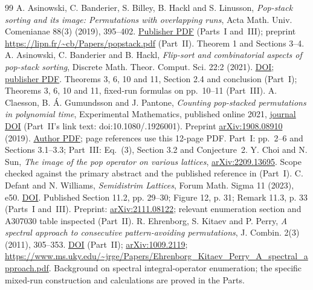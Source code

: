 \documentclass[11pt,letterpaper]{article}
\numberwithin{equation}{section}
\theoremstyle{remark}\newtheorem{remark}[theorem]{Remark}
\begin{document}
\begin{thebibliography}{99}
A. Asinowski, C. Banderier, S. Billey, B. Hackl and S. Linusson,
\emph{Pop-stack sorting and its image: Permutations with overlapping runs},
Acta Math. Univ. Comenianae 88(3) (2019), 395--402.
\href{https://www.iam.fmph.uniba.sk/amuc/ojs/index.php/amuc/article/download/1307/672/}{Publisher PDF} (Parts~I and~III);
preprint \url{https://lipn.fr/~cb/Papers/popstack.pdf} (Part~II).
Theorem 1 and Sections 3--4.
A. Asinowski, C. Banderier and B. Hackl,
\emph{Flip-sort and combinatorial aspects of pop-stack sorting},
Discrete Math. Theor. Comput. Sci. 22:2 (2021).
\href{https://doi.org/10.46298/dmtcs.6196}{DOI};
\href{https://dmtcs.episciences.org/7411/pdf}{publisher PDF}.
Theorems 3, 6, 10 and 11, Section 2.4 and conclusion (Part~I); Theorems 3, 6, 10 and 11, fixed-run formulas on pp.~10--11 (Part~III).
A. Claesson, B. \'A. Gu\dh mundsson and J. Pantone,
\emph{Counting pop-stacked permutations in polynomial time},
Experimental Mathematics, published online 2021,
\href{https://doi.org/10.1080/10586458.2021.1926001}{journal DOI} (Part~II's link text: doi:10.1080/.1926001).
Preprint \href{https://arxiv.org/abs/1908.08910}{arXiv:1908.08910} (2019).
\href{https://akc.is/papers/033-Counting-pop-stacked-permutations-in-polynomial-time.pdf}{Author PDF};
page references use this 12-page PDF. Part~I: pp.~2--6 and Sections 3.1--3.3; Part~III: Eq.~(3), Section 3.2 and Conjecture~2.
Y. Choi and N. Sun, \emph{The image of the pop operator on various lattices},
\href{https://arxiv.org/abs/2209.13695}{arXiv:2209.13695}.
Scope checked against the primary abstract and the published reference
in \cite{dw} (Part~I).
C. Defant and N. Williams, \emph{Semidistrim Lattices},
Forum Math. Sigma 11 (2023), e50.
\href{https://doi.org/10.1017/fms.2023.46}{DOI}.
Published Section 11.2, pp. 29--30; Figure 12, p. 31;
Remark 11.3, p. 33 (Parts~I and~III). Preprint: \href{https://arxiv.org/abs/2111.08122}{arXiv:2111.08122}; relevant enumeration section and A307030 table inspected (Part~II).
R. Ehrenborg, S. Kitaev and P. Perry,
\emph{A spectral approach to consecutive pattern-avoiding permutations},
J. Combin. 2(3) (2011), 305--353.
\href{https://doi.org/10.4310/JOC.2011.v2.n3.a1}{DOI} (Part~II);
\href{https://arxiv.org/abs/1009.2119}{arXiv:1009.2119};
\url{https://www.ms.uky.edu/~jrge/Papers/Ehrenborg_Kitaev_Perry_A_spectral_approach.pdf}.
Background on spectral integral-operator enumeration; the specific mixed-run
construction and calculations are proved in the Parts.

\end{thebibliography}
\end{document}
